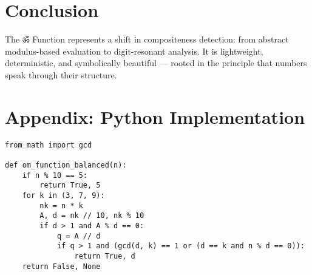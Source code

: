 \documentclass{article}
\begin{document}
\section{Conclusion}
The ॐ Function represents a shift in compositeness detection: from abstract modulus-based evaluation to digit-resonant analysis. It is lightweight, deterministic, and symbolically beautiful — rooted in the principle that numbers speak through their structure.

\section*{Appendix: Python Implementation}
\begin{verbatim}
from math import gcd

def om_function_balanced(n):
    if n % 10 == 5:
        return True, 5
    for k in (3, 7, 9):
        nk = n * k
        A, d = nk // 10, nk % 10
        if d > 1 and A % d == 0:
            q = A // d
            if q > 1 and (gcd(d, k) == 1 or (d == k and n % d == 0)):
                return True, d
    return False, None
\end{verbatim}
\end{document}
